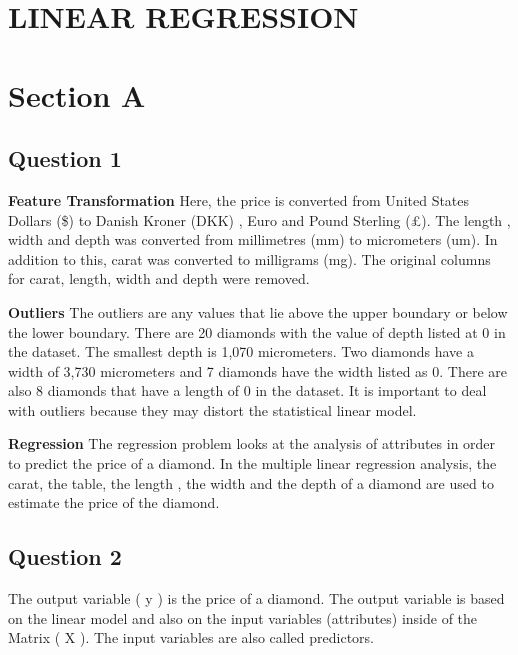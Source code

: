 \documentclass[
]{article}
\begin{document}
\newpage

\hypertarget{linear-regression}{%
\section{LINEAR REGRESSION}\label{linear-regression}}

\hypertarget{section-a}{%
\section{Section A}\label{section-a}}

\hypertarget{question-1}{%
\subsection{Question 1}\label{question-1}}

\textbf{Feature Transformation} Here, the price is converted from United
States Dollars (\$) to Danish Kroner (DKK) , Euro and Pound Sterling
(£). The length , width and depth was converted from millimetres (mm) to
micrometers (um). In addition to this, carat was converted to milligrams
(mg). The original columns for carat, length, width and depth were
removed.

\textbf{Outliers} The outliers are any values that lie above the upper
boundary or below the lower boundary. There are 20 diamonds with the
value of depth listed at 0 in the dataset. The smallest depth is 1,070
micrometers. Two diamonds have a width of 3,730 micrometers and 7
diamonds have the width listed as 0. There are also 8 diamonds that have
a length of 0 in the dataset. It is important to deal with outliers
because they may distort the statistical linear model.

\textbf{Regression} The regression problem looks at the analysis of
attributes in order to predict the price of a diamond. In the multiple
linear regression analysis, the carat, the table, the length , the width
and the depth of a diamond are used to estimate the price of the
diamond.

\hypertarget{question-2}{%
\subsection{Question 2}\label{question-2}}

The output variable ( y ) is the price of a diamond. The output variable
is based on the linear model and also on the input variables
(attributes) inside of the Matrix ( X ). The input variables are also
called predictors.
\end{document}
